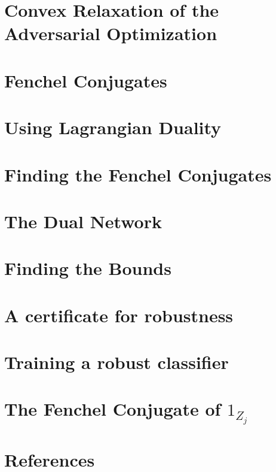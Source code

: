 \documentclass{amsart}
\begin{document}
\pagebreak

\section{Convex Relaxation of the Adversarial Optimization}



\pagebreak

\section{Fenchel Conjugates}



\pagebreak

\section{Using Lagrangian Duality}



\pagebreak

\section{Finding the Fenchel Conjugates}



\pagebreak

\section{The Dual Network}



\pagebreak

\section{Finding the Bounds}



\pagebreak

\section{A certificate for robustness}



\pagebreak

\section{Training a robust classifier}



\pagebreak

\section{The Fenchel Conjugate of \texorpdfstring{$1_{Z_j}$}{1\_Z\_j}}



\pagebreak

\section{References}



\pagebreak

\printbibliography
\end{document}
